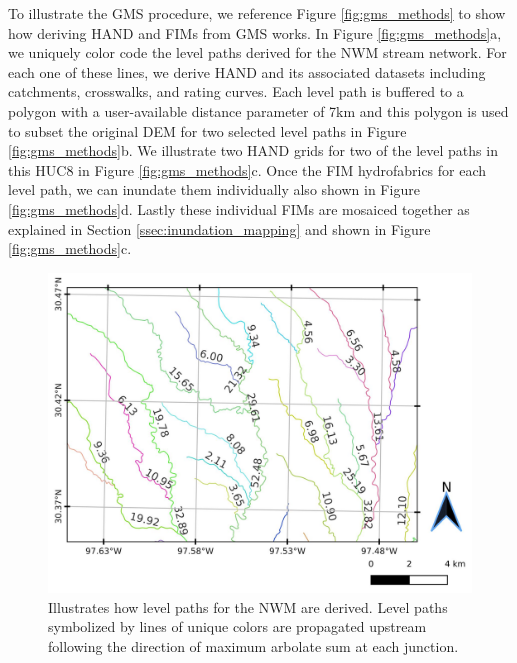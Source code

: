 To illustrate the GMS procedure, we reference Figure \ref{fig:gms_methods} to show how deriving HAND and FIMs from GMS works.
In Figure \ref{fig:gms_methods}a, we uniquely color code the level paths derived for the NWM stream network. 
For each one of these lines, we derive HAND and its associated datasets including catchments, crosswalks, and rating curves.
Each level path is buffered to a polygon with a user-available distance parameter of 7km and this polygon is used to subset the original DEM for two selected level paths in Figure \ref{fig:gms_methods}b.
We illustrate two HAND grids for two of the level paths in this HUC8 in Figure \ref{fig:gms_methods}c.
Once the FIM hydrofabrics for each level path, we can inundate them individually also shown in Figure \ref{fig:gms_methods}d.
Lastly these individual FIMs are mosaiced together as explained in Section \ref{ssec:inundation_mapping} and shown in Figure \ref{fig:gms_methods}c.
%
\begin{figure}[h!]
\centering
\includegraphics[scale=1.0]{figures/level_path_methods.jpg}
\caption{Illustrates how level paths for the NWM are derived.
Level paths symbolized by lines of unique colors are propagated upstream following the direction of maximum arbolate sum at each junction.
}
\label{fig:level_path_methods}
\end{figure}
%
%
